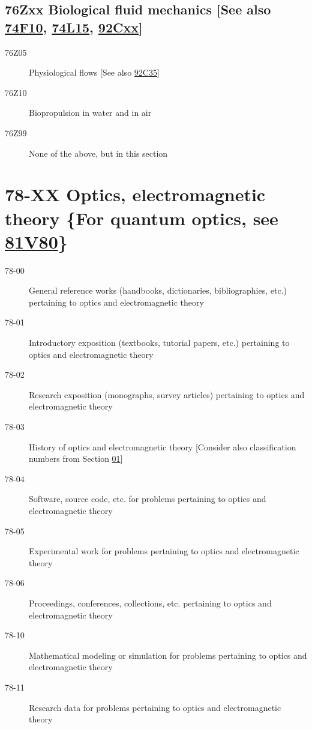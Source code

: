 \subsection*{76Zxx  Biological fluid mechanics [See also \hyperref[74F10]{74F10}, \hyperref[74L15]{74L15}, \hyperref[92Cxx]{92Cxx}] }\label{76Zxx}
\begin{description}  
\item [76Z05]\label{76Z05} Physiological flows [See also \hyperref[92C35]{92C35}]
\item [76Z10]\label{76Z10} Biopropulsion in water and in air
\item [76Z99]\label{76Z99} None of the above, but in this section
\end{description}
\section*{78-XX Optics, electromagnetic theory \{For quantum optics, see \hyperref[81V80]{81V80}\} }\label{78-XX}
\begin{description}
\item [78-00]\label{78-00} General reference works (handbooks, dictionaries, bibliographies, etc.) pertaining to optics and electromagnetic theory
\item [78-01]\label{78-01} Introductory exposition (textbooks, tutorial papers, etc.) pertaining to optics and electromagnetic theory
\item [78-02]\label{78-02} Research exposition (monographs, survey articles) pertaining to optics and electromagnetic theory
\item [78-03]\label{78-03} History of optics and electromagnetic theory [Consider also classification numbers from Section \hyperref[01-XX]{01}]
\item [78-04]\label{78-04} Software, source code, etc. for problems pertaining to optics and electromagnetic theory
\item [78-05]\label{78-05} Experimental work for problems pertaining to optics and electromagnetic theory
\item [78-06]\label{78-06} Proceedings, conferences, collections, etc. pertaining to optics and electromagnetic theory
\item [78-10]\label{78-10} Mathematical modeling or simulation for problems pertaining to optics and electromagnetic theory
\item [78-11]\label{78-11} Research data for problems pertaining to optics and electromagnetic theory
\end{description}
